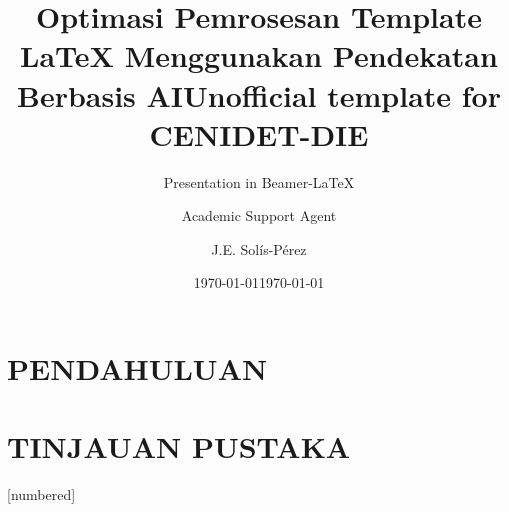 \documentclass{beamer}
\title{Optimasi Pemrosesan Template LaTeX Menggunakan Pendekatan Berbasis AI}
\author{Academic Support Agent}
\date{\today}
\begin{document}
\maketitle

\begin{abstract}

\end{abstract}

\chapter{PENDAHULUAN}


\chapter{TINJAUAN PUSTAKA}


[numbered]


\usepackage[utf8]{inputenc}
\usepackage[T1]{fontenc}
\usepackage{helvet}
\usepackage{graphicx} %
\usepackage{booktabs} %
\usepackage{natbib}


\title{Unofficial template for CENIDET-DIE}
\subtitle{Presentation in Beamer-\LaTeX}
\author{J.E. Solís-Pérez}
\date{\today}

\end{document}
